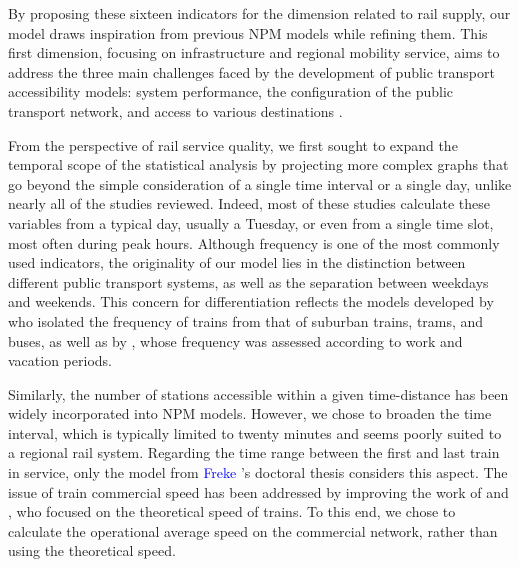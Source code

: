 \begin{refsegment}
By proposing these sixteen indicators for the dimension related to rail supply, our model draws inspiration from previous \acrshort{NPM} models while refining them. This first dimension, focusing on infrastructure and regional mobility service, aims to address the three main challenges faced by the development of public transport accessibility models: system performance, the configuration of the public transport network, and access to various destinations \textcolor{blue}{\autocite[744]{malekzadeh_review_2020}}.%

From the perspective of rail service quality, we first sought to expand the temporal scope of the statistical analysis by projecting more complex graphs that go beyond the simple consideration of a single time interval or a single day, unlike nearly all of the studies reviewed. Indeed, most of these studies calculate these variables from a typical day, usually a Tuesday, or even from a single time slot, most often during peak hours. Although frequency is one of the most commonly used indicators, the originality of our model lies in the distinction between different public transport systems, as well as the separation between weekdays and weekends. This concern for differentiation reflects the models developed by \textcolor{blue}{\textcite[149]{ivan_evaluation_2012}} who isolated the frequency of trains from that of suburban trains, trams, and buses, as well as by \textcolor{blue}{\textcite[117]{nigro_land_2019}}, whose frequency was assessed according to work and vacation periods.%

Similarly, the number of stations accessible within a given time-distance has been widely incorporated into \acrshort{NPM} models. However, we chose to broaden the time interval, which is typically limited to twenty minutes and seems poorly suited to a regional rail system. Regarding the time range between the first and last train in service, only the model from \textcolor{blue}{Freke} \textcolor{blue}{\textcite[132]{caset_planning_2019}}’s doctoral thesis considers this aspect. The issue of train commercial speed has been addressed by improving the work of \textcolor{blue}{\textcite[271]{debrezion_modelling_2009}} and \textcolor{blue}{\textcite[6]{zheng_classifying_2023}}, who focused on the theoretical speed of trains. To this end, we chose to calculate the operational average speed on the commercial network, rather than using the theoretical speed.%


\end{refsegment}

